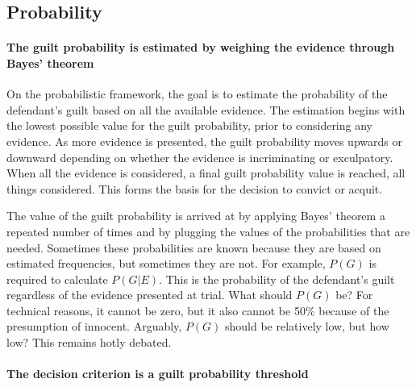 \documentclass[10pt]{article}
\begin{document}
\subsection{Probability}


\paragraph{The guilt probability is estimated by weighing  the evidence through Bayes' theorem}

 On the probabilistic framework, the goal is to estimate the probability of the defendant's guilt based 
 on all the available evidence. The estimation begins with the lowest possible value 
for the guilt probability, prior to considering any evidence. As more evidence is presented, the guilt probability 
moves upwards or downward depending on whether the evidence is incriminating or exculpatory. 
When all the evidence is considered, a final guilt probability value is 
reached, all things considered. This forms the basis for 
the decision to convict or acquit. 

The value of the guilt probability is arrived at by applying Bayes' theorem a 
repeated number of times and by plugging the values of the probabilities that are needed. 
Sometimes these probabilities are known because they are based on estimated frequencies, but sometimes 
they are not. For example, $P(G)$ is required to calculate $P(G|E)$. 
This is the probability of the defendant's guilt regardless of the evidence 
presented at trial. What should $P(G)$ be?
For technical reasons, it cannot be zero, but it also cannot be 50\% because 
of the presumption of innocent. Arguably, $P(G)$ should be relatively low, but how low?
This remains  hotly debated. 


\paragraph{The decision criterion is a guilt probability threshold}
\end{document}
